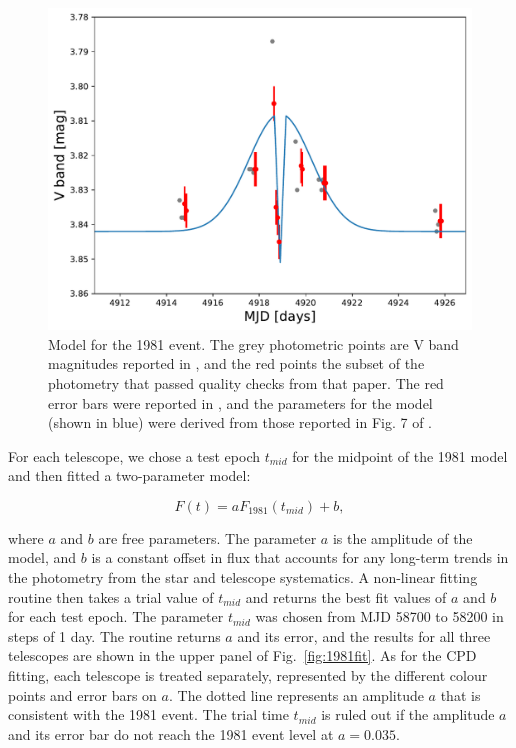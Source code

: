 \documentclass[longauth]{aa} %
\begin{document}
\begin{figure}[htb]
\centering
\includegraphics[width=\columnwidth]{m1981model.pdf}
\caption{Model for the 1981 event. The grey photometric points are V band magnitudes reported in \citet{LecavelierdesEtangs95}, and the red points the subset of the photometry that passed quality checks from that paper. The red error bars were reported in \citet{Lamers97}, and the parameters for the model (shown in blue) were derived from those reported in Fig. 7 of \citet{Lamers97}.}
\label{fig:1981model}
\end{figure}

For each telescope, we chose a test epoch $t_{mid}$ for the midpoint of the 1981 model and then fitted a two-parameter model:

$$F(t) = a F_{1981}(t_{mid}) + b,$$

where $a$ and $b$ are free parameters.
%
The parameter $a$ is the amplitude of the model, and $b$ is a constant offset in flux that accounts for any long-term trends in the photometry from the star and telescope systematics.
%
A non-linear fitting routine then takes a trial value of $t_{mid}$ and returns the best fit values of $a$ and $b$ for each test epoch.
%
The parameter $t_{mid}$ was chosen from MJD 58700 to 58200 in steps of 1 day.
%
The routine returns $a$ and its error, and the results for all three telescopes are shown in the upper panel of Fig.~\ref{fig:1981fit}.
%
As for the CPD fitting, each telescope is treated separately, represented by the different colour points and error bars on $a$.
%
The dotted line represents an amplitude $a$ that is consistent with the 1981 event.
%
The trial time $t_{mid}$ is ruled out if the amplitude $a$ and its error bar do not reach the 1981 event level at $a=0.035$.
\end{document}
